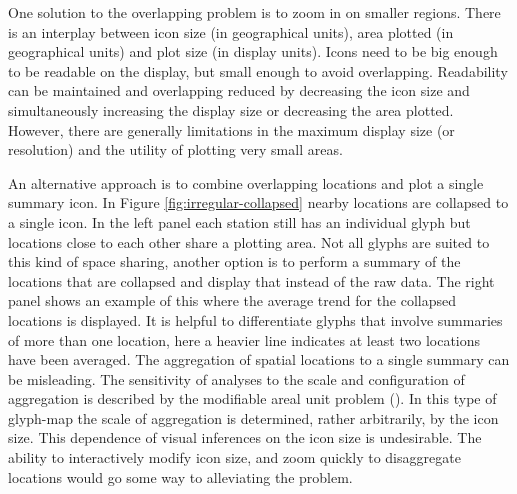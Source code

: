 \documentclass[oneside]{article}
\begin{document}
One solution to the overlapping problem is to zoom in on smaller regions. There is an interplay between icon size (in geographical units), area plotted (in geographical units) and plot size (in display units).  Icons need to be big enough to be readable on the display, but small enough to avoid overlapping.  Readability can be maintained and overlapping reduced by decreasing the icon size and simultaneously increasing the display size or decreasing the area plotted.
However, there are generally limitations in the maximum display size (or resolution) and the utility of plotting very small areas.  

An alternative approach is to combine overlapping locations and plot a single summary icon.  In Figure \ref{fig:irregular-collapsed} nearby locations are collapsed to a single icon.  In the left panel each station still has an individual glyph but locations close to each other share a plotting area.  Not all glyphs are suited to this kind of space sharing, another option is to perform a summary of the locations that are collapsed and display that instead of the raw data.  The right panel shows an example of this where the average trend for the collapsed locations is displayed.  It is helpful to differentiate glyphs that involve summaries of more than one location, here a heavier line indicates at least two locations have been averaged.  The aggregation of spatial locations to a single summary can be misleading.  The sensitivity of analyses to the scale and configuration of aggregation is described by the  modifiable areal unit problem (\cite{Openshaw:1984kx, Fotheringham:1991uq}). In this type of glyph-map the scale of aggregation is determined, rather arbitrarily, by the icon size. This dependence of visual inferences on the icon size is undesirable.  The ability to interactively modify icon size, and zoom quickly to disaggregate locations would go some way to alleviating the problem.
\end{document}
